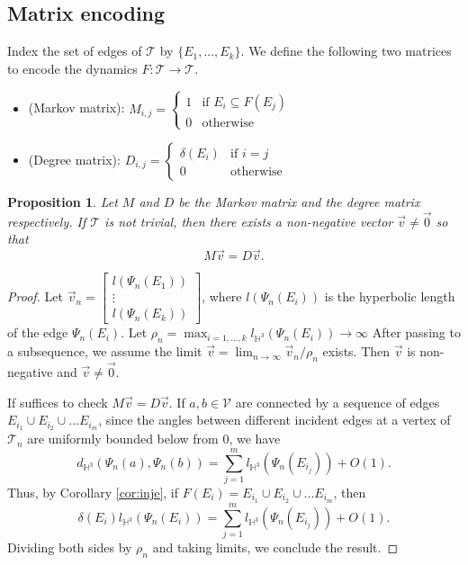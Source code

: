 \documentclass[11pt, reqno]{amsart}
\numberwithin{equation}{section}
\theoremstyle{plain}
\theoremstyle{theorem}
\newtheorem{prop}[theorem]{Proposition}
\theoremstyle{plain}
\theoremstyle{definition}
\newcommand{\Hyp}{\mathbb{H}}
\newcommand{\RT}{\mathscr{T}}
\newcommand{\RV}{\mathscr{V}}
\numberwithin{figure}{section}
\begin{document}
\subsection*{Matrix encoding}
Index the set of edges of $\RT$ by
$\{E_1,..., E_k\}$.
We define the following two matrices to encode the dynamics $F: \RT\longrightarrow \RT$.
\begin{itemize}
\item (Markov matrix): $M_{i,j} = \begin{cases} 1 &\mbox{if } E_i \subseteq F(E_j) \\ 
0 & \mbox{otherwise } \end{cases}$
\item (Degree matrix): $D_{i,j} = \begin{cases} \delta(E_i) &\mbox{if } i = j \\ 
0 & \mbox{otherwise } \end{cases}$
\end{itemize}
\begin{prop}\label{prop:mdto}
Let $M$ and $D$ be the Markov matrix and the degree matrix respectively.
If $\RT$ is not trivial, then there exists a non-negative vector $\vec{v} \neq \vec{0}$ so that
$$
M\vec v = D \vec v.
$$
\end{prop}
\begin{proof}
Let $\vec{v}_n =\begin{bmatrix}
l(\Psi_n(E_1))\\
\vdots\\
l(\Psi_n(E_k))
\end{bmatrix}$, where $l(\Psi_n(E_i))$ is the hyperbolic length of the edge $\Psi_n(E_i)$.
Let $\rho_n = \max_{i=1,..., k} l_{\Hyp^3} (\Psi_n(E_i)) \to \infty$
After passing to a subsequence, we assume the limit $\vec{v} = \lim_{n\to\infty} \vec{v}_n/\rho_n$ exists.
Then $\vec{v}$ is non-negative and $\vec{v} \neq \vec{0}$.

If suffices to check $M\vec v = D \vec v$.
If $a, b \in \RV$ are connected by a sequence of edges $E_{i_1} \cup E_{i_2} \cup... E_{i_m}$, 
since the angles between different incident edges at a vertex of $\RT_n$ are uniformly bounded below from $0$, we have
$$
d_{\Hyp^3}(\Psi_n(a), \Psi_n(b)) = \sum_{j=1}^m l_{\Hyp^3}(\Psi_n(E_{i_j})) + O(1).
$$ 
Thus, by Corollary \ref{cor:inje}, if $F(E_i) = E_{i_1} \cup E_{i_2} \cup... E_{i_m}$, then 
$$
\delta(E_i) l_{\Hyp^3} (\Psi_n(E_i)) = \sum_{j=1}^m l_{\Hyp^3}(\Psi_n(E_{i_j})) + O(1).
$$
Dividing both sides by $\rho_n$ and taking limits, we conclude the result.
\end{proof}
\end{document}
